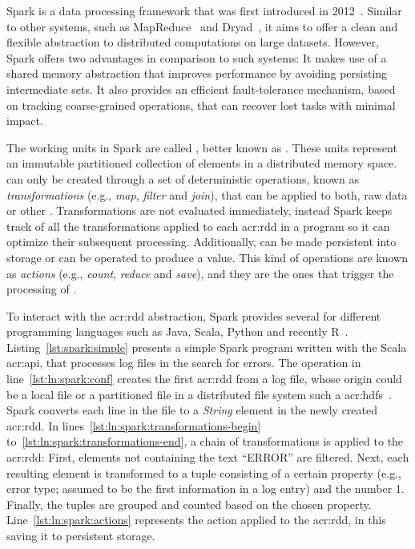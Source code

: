 \label{sec:spark}


Spark is a data processing framework that was first introduced in 2012~\cite{Zaharia2012a}. Similar to other systems, such as MapReduce~\cite{Dean2004} and Dryad~\cite{Isard2007}, it aims to offer a clean and flexible abstraction to distributed computations on large datasets. However, Spark offers two advantages in comparison to such systems: It makes use of a shared memory abstraction that improves performance by avoiding persisting intermediate sets. It also provides an efficient fault-tolerance mechanism, based on tracking coarse-grained operations, that can recover lost tasks with minimal impact.

The working units in Spark are called \textit{}, better known as . These units represent an immutable partitioned collection of elements in a distributed memory space.  can only be created through a set of deterministic operations, known as \textit{transformations} (e.g., \textit{map}, \textit{filter} and \textit{join}), that can be applied to both, raw data or other . Transformations are not evaluated immediately, instead Spark keeps track of all the transformations applied to each \acrshort{acr:rdd} in a program so it can optimize their subsequent processing. Additionally,  can be made persistent into storage or can be operated to produce a value. This kind of operations are known as \textit{actions} (e.g., \textit{count}, \textit{reduce} and \textit{save}), and they are the ones that trigger the processing of .

To interact with the \acrshort{acr:rdd} abstraction, Spark provides several  for different programming languages such as Java, Scala, Python and recently R~\cite{Venkataraman2016}. Listing~\ref{lst:spark:simple} presents a simple Spark program written with the Scala \acrshort{acr:api}, that processes log files in the search for errors. The operation in line~\ref{lst:ln:spark:conf} creates the first \acrshort{acr:rdd} from a log file, whose origin could be a local file or a partitioned file in a distributed file system such a \acrfull{acr:hdfs}~\cite{WebHadoop2017}. Spark converts each line in the file to a \textit{String} element in the newly created \acrshort{acr:rdd}. In lines~\ref{lst:ln:spark:transformations-begin} to~\ref{lst:ln:spark:transformations-end}, a chain of transformations is applied to the \acrshort{acr:rdd}: First, elements not containing the text ``ERROR'' are filtered. Next, each resulting element is transformed to a tuple consisting of a certain property (e.g., error type; assumed to be the first information in a log entry) and the number 1. Finally, the tuples are grouped and counted based on the chosen property. Line~\ref{lst:ln:spark:actions} represents the action applied to the \acrshort{acr:rdd}, in this saving it to persistent storage.

